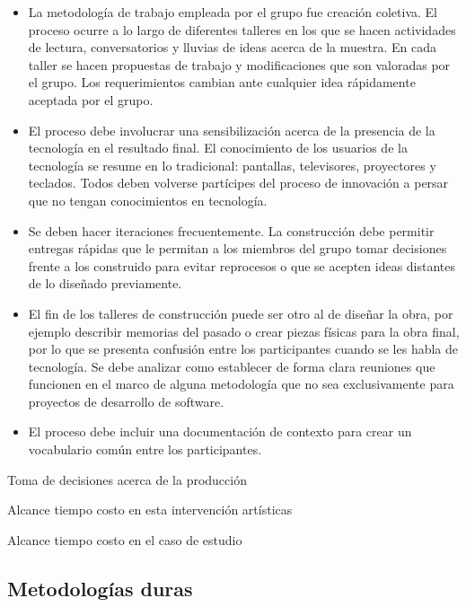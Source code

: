 \begin{itemize}

    \item La metodología de trabajo empleada por el grupo fue creación coletiva. El proceso ocurre a lo largo de diferentes talleres en los que se hacen actividades de lectura, conversatorios y lluvias de ideas acerca de la muestra. En cada taller se hacen propuestas de trabajo y modificaciones que son valoradas por el grupo. Los requerimientos cambian ante cualquier idea rápidamente aceptada por el grupo.

    \item El proceso debe involucrar una sensibilización acerca de la presencia de la tecnología en el resultado final. El conocimiento de los usuarios de la tecnología se resume en lo tradicional: pantallas, televisores, proyectores y teclados. Todos deben volverse partícipes del proceso de innovación a persar que no tengan conocimientos en tecnología.

    \item Se deben hacer iteraciones frecuentemente. La construcción debe permitir entregas rápidas que le permitan a los miembros del grupo tomar decisiones frente a los construido para evitar reprocesos o que se acepten ideas distantes de lo diseñado previamente.

    \item El fin de los talleres de construcción puede ser otro al de diseñar la obra, por ejemplo describir memorias del pasado o crear piezas físicas para la obra final, por lo que se presenta confusión entre los participantes cuando se les habla de tecnología. Se debe analizar como establecer de forma clara reuniones que funcionen en el marco de alguna metodología que no sea exclusivamente para proyectos de desarrollo de software.

    \item El proceso debe incluir una documentación de contexto para crear un vocabulario común entre los participantes.

\end{itemize}

Toma de decisiones acerca de la producción

Alcance tiempo costo en esta intervención artísticas

Alcance tiempo costo en el caso de estudio

\subsection{Metodologías duras}

